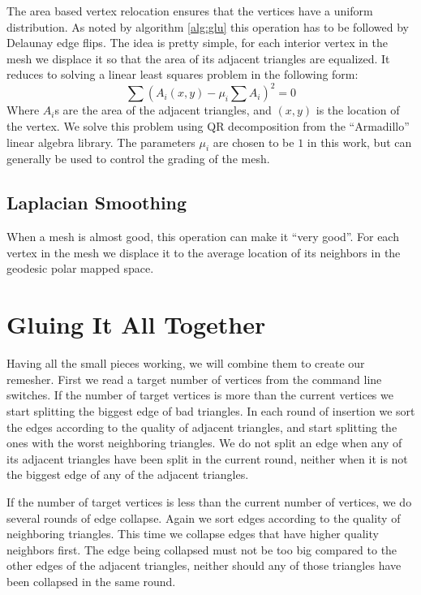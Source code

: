 \documentclass[letter,11pt]{article}
\begin{document}
The area based vertex relocation ensures that the vertices have a
uniform distribution. As noted by algorithm \ref{alg:glu} this
operation has to be followed by Delaunay edge flips. The idea is
pretty simple, for each interior vertex in the mesh we displace it so
that the area of its adjacent triangles are equalized. It reduces to
solving a linear least squares problem in the following form:
\[ \sum ( A_i(x,y) - \mu_i \sum A_i )^2 = 0 \]
Where $A_i$s are the area of the adjacent triangles, and $(x,y)$ is
the location of the vertex. We solve this problem using QR
decomposition from the ``Armadillo'' linear algebra library. The
parameters $\mu_i$ are chosen to be $1$ in this work, but can
generally be used to control the grading of the mesh.

\subsection*{Laplacian Smoothing}

When a mesh is almost good, this operation can make it ``very
good''. For each vertex in the mesh we displace it to the average
location of its neighbors in the geodesic polar mapped space.

\section*{Gluing It All Together}

Having all the small pieces working, we will combine them to create
our remesher. First we read a target number of vertices from the
command line switches. If the number of target vertices is more than
the current vertices we start splitting the biggest edge of bad
triangles. In each round of insertion we sort the edges according to
the quality of adjacent triangles, and start splitting the ones with
the worst neighboring triangles. We do not split an edge when any of
its adjacent triangles have been split in the current round, neither
when it is not the biggest edge of any of the adjacent triangles.

If the number of target vertices is less than the current number of
vertices, we do several rounds of edge collapse. Again we sort edges
according to the quality of neighboring triangles. This time we
collapse edges that have higher quality neighbors first. The edge
being collapsed must not be too big compared to the other edges of the
adjacent triangles, neither should any of those triangles have been
collapsed in the same round.
\end{document}
